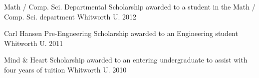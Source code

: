 \begin{cvhonors}
  \cvhonor
    {Math / Comp. Sci. Departmental Scholarship} %
    {awarded to a student in the Math / Comp. Sci. department} %
    {Whitworth U.} %
    {2012} %

  \cvhonor
    {Carl Hansen Pre-Engneering Scholarship} %
    {awarded to an Engineering student} %
    {Whitworth U.} %
    {2011} %

  \cvhonor
    {Mind \& Heart Scholarship} %
    {awarded to an entering undergraduate to assist with four years of tuition} %
    {Whitworth U.} %
    {2010} %

\end{cvhonors}
